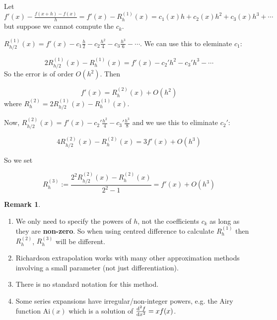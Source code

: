 \documentclass[12pt,a4paper]{article}
\theoremstyle{definition}
\newtheorem*{remark}{Remark}
\begin{document}
Let $f'(x) - \frac{f(x + h) - f(x)}{h} = f'(x) - R_h^{(1)} (x) = c_1(x) h + c_2(x) h^2 + c_3(x) h^3 + \cdots$ but suppose we cannot compute the $c_k$.

$R_{h / 2}^{(1)} (x) = f'(x) - c_1 \frac{h}{2} - c_2 \frac{h^2}{4} - c_3 \frac{h^3}{6} - \cdots$. We can use this to eleminate $c_1$:

\[ 2 R_{h / 2}^{(1)} (x) - R_h^{(1)} (x) = f'(x) - c_2' h^2 - c_3' h^3 - \cdots \]
So the error is of order $O(h^2)$. Then

\[ f'(x) = R_h^{(2)} (x) + O(h^2) \]
where $R_h^{(2)} = 2 R_{h / 2}^{(1)} (x) - R_h^{(1)} (x)$.

Now, $R_{h / 2}^{(2)} (x) = f'(x) - c_2' \frac{h^2}{4} - c_3' \frac{h^3}{8}$ and we use this to eliminate $c_2'$:

\[ 4 R_{h / 2}^{(2)} (x) - R_h^{(2)} (x) = 3 f'(x) + O(h^3) \]

So we set

\[ R_h^{(3)} := \frac{2^2 R_{h / 2}^{(2)} (x) - R_h^{(2)}(x)}{2^2 - 1} = f'(x) + O(h^3) \]

\begin{remark}
	\hfill
	\begin{enumerate}
		\item We only need to specify the powers of $h$, not the coefficients $c_k$ as long as they are \textbf{non-zero}. So when using centred difference to calculate $R_h^{(1)}$ then $R_h^{(2)}$, $R_h^{(3)}$ will be different.
		\item Richardson extrapolation works with many other approximation methods involving a small parameter (not just differentiation).
		\item There is no standard notation for this method.
		\item Some series expansions have irregular/non-integer powers, e.g. the Airy function $\text{Ai}(x)$ which is a solution of $\diff[2]{f}{x} = x f(x)$.
	\end{enumerate}
\end{remark}
\end{document}
